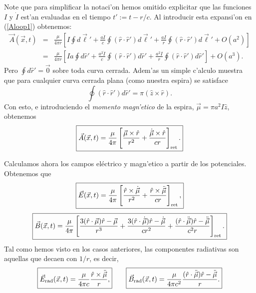 Note que para simplificar la notaci'on hemos omitido explicitar que las funciones $I$ y $\dot{I}$ est'an evaluadas en el tiempo $t':=t-r/c$. Al introducir esta expansi'on en (\ref{Aloop1}) obtenemos:
\begin{eqnarray}
 \vec{A}(\vec{x},t)&=&\frac{\mu}{4\pi r}\left[I\oint d\vec{\ell}'
+\frac{a\dot{I}}{c}\oint(\hat{r}\cdot\hat{r}')d\vec{\ell}'+\frac{aI}{r}\oint(\hat{r}\cdot\hat{r}')d\vec{\ell}'+O(a^2)\right]  \\
&=&\frac{\mu}{4\pi r}\left[Ia\oint d\hat{r}'
+\frac{a^2\dot{I}}{c}\oint(\hat{r}\cdot\hat{r}')d\hat{r}'+\frac{a^2I}{r}\oint(\hat{r}\cdot\hat{r}')d\hat{r}'\right] +O(a^3).
\end{eqnarray}
Pero $\oint d\hat{r}'=\vec{0}$ sobre toda curva cerrada. Adem'as un simple c'alculo muestra que para cualquier curva cerrada plana (como nuestra espira) se satisface 
\begin{equation}
\oint(\hat{r}\cdot\hat{r}')d\hat{r}'=\pi(\hat{z}\times\hat{r}) .
\end{equation}
Con esto, e introduciendo el \textit{momento magn'etico} de la espira, $\vec{\mu}=\pi a^2I\hat{z}$, obtenemos
\begin{equation}
 \boxed{\vec{A}(\vec{x},t)=\frac{\mu}{4\pi}\left[\frac{\vec{\mu}\times\hat{r}}{r^2}+\frac{\dot{\vec{\mu}}\times\hat{r}}{cr}\right]_{\rm ret}.}
\end{equation}

Calculamos ahora los campos eléctrico y magn'etico a partir de los potenciales. Obtenemos que
\begin{equation}
 \boxed{\vec{E}(\vec{x},t)=\frac{\mu}{4\pi}\left[\frac{\hat{r}\times\dot{\vec{\mu}}}{r^2}+\frac{\hat{r}\times\ddot{\vec{\mu}}}{cr}\right]_{\rm ret},}
\end{equation}
\begin{equation}
\boxed{ \vec{B}(\vec{x},t)=\frac{\mu}{4\pi}\left[\frac{3(\hat{r}\cdot\vec{\mu})\hat{r}-\vec{\mu}}{r^3}+\frac{3(\hat{r}\cdot\dot{\vec{\mu}})\hat{r}-\dot{\vec{\mu}}}{cr^2}+\frac{(\hat{r}\cdot\ddot{\vec{\mu}})\hat{r}-\ddot{\vec{\mu}}}{c^2r}\right]_{\rm ret}.}
\end{equation}
Tal como hemos visto en los casos anteriores, las componentes radiativas son aquellas que decaen con $1/r$, es decir,
\begin{equation}
 \boxed{\vec{E}_{\rm rad}(\vec{x},t)
=\frac{\mu}{4\pi c}\frac{\hat{r}\times\ddot{\vec{\mu}}}{r},} \qquad
 \boxed{\vec{B}_{\rm rad}(\vec{x},t)=\frac{\mu}{4\pi c^2}\frac{(\hat{r}\cdot\ddot{\vec{\mu}})\hat{r}-\ddot{\vec{\mu}}}{r}.}
\end{equation}


